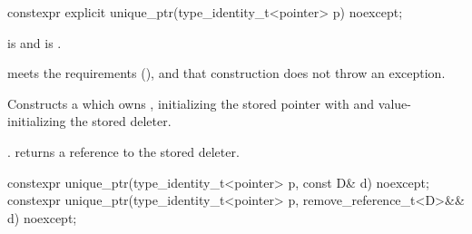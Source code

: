 %
\begin{itemdecl}
constexpr explicit unique_ptr(type_identity_t<pointer> p) noexcept;
\end{itemdecl}

\begin{itemdescr}
\pnum
\constraints
{} is  and
 is .

\pnum
\expects
{} meets the  requirements (),
and that construction does not throw an exception.

\pnum
\effects
Constructs a  which owns
, initializing the stored pointer with  and
value-initializing the stored deleter.

\pnum
\ensures
{}. 
returns a reference to the stored deleter.
\end{itemdescr}

%
\begin{itemdecl}
constexpr unique_ptr(type_identity_t<pointer> p, const D& d) noexcept;
constexpr unique_ptr(type_identity_t<pointer> p, remove_reference_t<D>&& d) noexcept;
\end{itemdecl}

